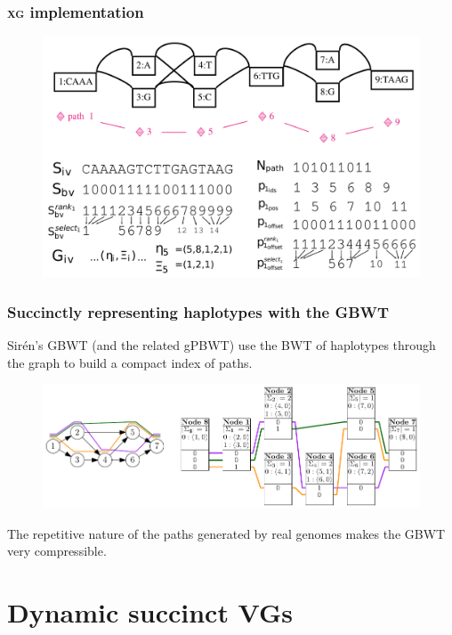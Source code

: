 \documentclass{beamer}
\begin{document}
\begin{frame}
  \frametitle{\textsc{xg} implementation}
  \begin{figure}
    \includegraphics[scale=0.375,center]{xg_index_sketch_nice.pdf}
  \end{figure}
\end{frame}

\begin{frame}
  \frametitle{Succinctly representing haplotypes with the GBWT}
  Sirén's GBWT (and the related gPBWT) use the BWT of haplotypes through the graph to build a compact index of paths.

  \begin{figure}
    \includegraphics[scale=0.75,center]{gbwt-example.pdf}
  \end{figure}

  The repetitive nature of the paths generated by real genomes makes the GBWT very compressible.
\end{frame}


\section{Dynamic succinct VGs}

\end{document}
